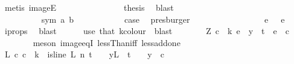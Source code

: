 \begin{isabellebody}
\ {\isacharparenleft}{\kern0pt}metis\ imageE{\isacharparenright}{\kern0pt}\isanewline
\ \ \ \ \ \ \ \ \ \ \ \ \isamarkupfalse%
\ \isamarkupfalse%
\ {\isacharquery}{\kern0pt}thesis\ \isamarkupfalse%
\ blast\isanewline
\ \ \ \ \ \ \ \ \ \ \isamarkupfalse%
\isanewline
\ \ \ \ \ \ \ \ \isamarkupfalse%
\isanewline
\ \ \ \ \ \ \isamarkupfalse%
\isanewline
\ \ \ \ \ \ \ \ \isamarkupfalse%
\ {\isacharparenleft}{\kern0pt}sym\ a\ b{\isacharparenright}{\kern0pt}\isanewline
\ \ \ \ \ \ \ \ \isamarkupfalse%
\ \isamarkupfalse%
\ {\isacharquery}{\kern0pt}case\ \isamarkupfalse%
\ presburger\isanewline
\ \ \ \ \ \ \isamarkupfalse%
\isanewline
\ \ \ \ \ \ \isamarkupfalse%
\ \isamarkupfalse%
\ {\isachardoublequoteopen}{\isasymchi}\ e{}\ {\isacharequal}{\kern0pt}\ {\isasymchi}\ e{}{\isachardoublequoteclose}\ \isamarkupfalse%
\ i{\isacharunderscore}{\kern0pt}props{\isacharparenleft}{\kern0pt}{}{\isacharcomma}{\kern0pt}{}{\isacharparenright}{\kern0pt}\ \isamarkupfalse%
\ blast\isanewline
\ \ \ \ \isamarkupfalse%
\ {\isacharparenleft}{\kern0pt}use\ that{\isacharparenleft}{\kern0pt}{}{\isacharparenright}{\kern0pt}\ k{\isacharunderscore}{\kern0pt}colour\ \ blast{\isacharparenright}{\kern0pt}\isanewline
\ \ \ \ \isamarkupfalse%
\ \isamarkupfalse%
\ Z{}{\isacharcolon}{\kern0pt}\ {\isachardoublequoteopen}{\isasymexists}c\ {\isacharless}{\kern0pt}\ k{\isachardot}{\kern0pt}\ {\isasymforall}e\ {\isasymin}\ y\ {\isacharbackquote}{\kern0pt}\ {\isacharbraceleft}{\kern0pt}{\isachardot}{\kern0pt}{\isachardot}{\kern0pt}{\isacharless}{\kern0pt}t{\isacharplus}{\kern0pt}{}{\isacharbraceright}{\kern0pt}{\isachardot}{\kern0pt}\ {\isasymchi}\ e\ {\isacharequal}{\kern0pt}\ c{\isachardoublequoteclose}\isanewline
\ \ \ \ \ \ \isamarkupfalse%
\ {\isacharparenleft}{\kern0pt}meson\ image{\isacharunderscore}{\kern0pt}eqI\ lessThan{\isacharunderscore}{\kern0pt}iff\ less{\isacharunderscore}{\kern0pt}add{\isacharunderscore}{\kern0pt}one{\isacharparenright}{\kern0pt}\isanewline
\ \ \isacommand{{\isacharbraceright}{\kern0pt}}\isamarkupfalse%
\isanewline
\ \ \isamarkupfalse%
\ \isamarkupfalse%
\ {\isachardoublequoteopen}{\isasymexists}L\ c{\isachardot}{\kern0pt}\ c\ {\isacharless}{\kern0pt}\ k\ {\isasymand}\ is{\isacharunderscore}{\kern0pt}line\ L\ n\ {\isacharparenleft}{\kern0pt}t\ {\isacharplus}{\kern0pt}\ {}{\isacharparenright}{\kern0pt}\ {\isasymand}\ {\isacharparenleft}{\kern0pt}{\isasymforall}y{\isasymin}L\ {\isacharbackquote}{\kern0pt}\ {\isacharbraceleft}{\kern0pt}{\isachardot}{\kern0pt}{\isachardot}{\kern0pt}{\isacharless}{\kern0pt}t\ {\isacharplus}{\kern0pt}\ {}{\isacharbraceright}{\kern0pt}{\isachardot}{\kern0pt}\ {\isasymchi}\ y\ {\isacharequal}{\kern0pt}\ c{\isacharparenright}{\kern0pt}{\isachardoublequoteclose}\ \isamarkupfalse%

\end{isabellebody}

